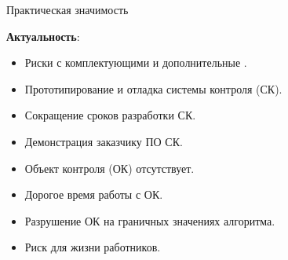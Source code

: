 \begin{frame}{Практическая значимость}

    \textbf{Актуальность}:
    \begin{itemize}
        \item Риски с комплектующими и дополнительные \rouble.
        \item Прототипирование и отладка системы контроля (СК).
        \item Сокращение сроков разработки СК.
        \item Демонстрация заказчику ПО СК.
        \item Объект контроля (ОК) отсутствует.
        \item Дорогое время работы с ОК.
        \item Разрушение ОК на граничных значениях алгоритма.
        \item Риск для жизни работников.
    \end{itemize}
\end{frame}

